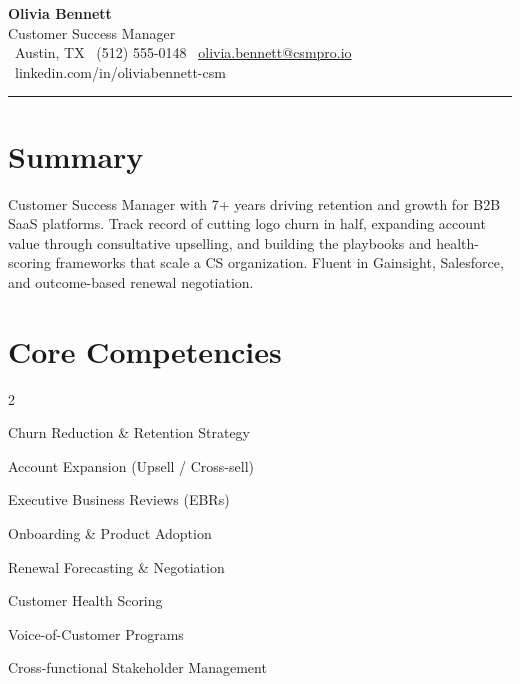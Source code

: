 \documentclass[10pt]{article}
\begin{document}
\begin{center}
  {\Huge\bfseries\color{csmblue} Olivia Bennett}\\[2pt]
  {\Large\color{gray700} Customer Success Manager}\\[4pt]
  {\small
    \faMapMarker\ Austin, TX \quad
    \faPhone\ (512) 555-0148 \quad
    \faEnvelope\ \href{mailto:olivia.bennett@csmpro.io}{olivia.bennett@csmpro.io} \quad
    \faLinkedin\ linkedin.com/in/oliviabennett-csm
  }
\end{center}

\vspace{-4pt}
{\color{csmteal}\rule{\linewidth}{1.1pt}}
\vspace{2pt}

\section*{Summary}
\vspace{-3pt}
Customer Success Manager with 7+ years driving retention and growth for B2B SaaS platforms.
Track record of cutting logo churn in half, expanding account value through consultative
upselling, and building the playbooks and health-scoring frameworks that scale a CS
organization. Fluent in Gainsight, Salesforce, and outcome-based renewal negotiation.

\section*{Core Competencies}
\vspace{-3pt}
\begin{multicols}{2}
\begin{tightlist}
  \item Churn Reduction \& Retention Strategy
  \item Account Expansion (Upsell / Cross-sell)
  \item Executive Business Reviews (EBRs)
  \item Onboarding \& Product Adoption
\end{tightlist}
\columnbreak
\begin{tightlist}
  \item Renewal Forecasting \& Negotiation
  \item Customer Health Scoring
  \item Voice-of-Customer Programs
  \item Cross-functional Stakeholder Management
\end{tightlist}
\end{multicols}
\end{document}
